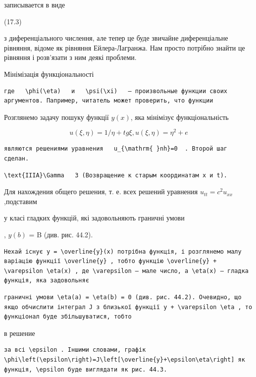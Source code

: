 \documentclass[
  ukrainian,
]{article}
\begin{document}
записывается в виде

(17.3)

з диференціального числення, але тепер це буде звичайне диференціальне
рівняння, відоме як рівняння Ейлера-Лагранжа. Нам просто потрібно знайти
це рівняння і розв'язати з ним деякі проблеми.

Мінімізація функціональності

\begin{verbatim}
где   \phi(\eta)   и   \psi(\xi)   — произвольные функции своих аргументов. Папример, читатель может проверить, что функции
\end{verbatim}

Розглянемо задачу пошуку функції \(y(x)\), яка мінімізує
функціональність

\[
u(\xi, \eta) = 1/\eta + tg \xi,    u(\xi, \eta) = \eta^2 + e
\]

\begin{verbatim}
являются решениями уравнения   u_{\mathrm{ }nh}=0  . Второй шаг сделан.
\end{verbatim}

\begin{verbatim}
\text{IIIA}\Gamma   3 (Возвращение к старым координатам x и t).
\end{verbatim}

Для нахождения общего решения, т. е. всех решений уравнения
\(u_{tt} = c^2 u_{xx}\),подставим

у класі гладких функцій, які задовольняють граничні умови

, \(y(b)\) = B (див. рис. 44.2).

\begin{verbatim}
Нехай існує y = \overline{y}(x) потрібна функція, і розглянемо малу варіацію функції \overline{y} , тобто функцію \overline{y} + \varepsilon \eta(x) , де \varepsilon — мале число, а \eta(x) — гладка функція, яка задовольняє
\end{verbatim}

\begin{verbatim}
граничні умови \eta(a) = \eta(b) = 0 (див. рис. 44.2). Очевидно, що якщо обчислити інтеграл J з близької функції y + \varepsilon \eta , то функціонал буде збільшуватися, тобто
\end{verbatim}

в решение

\begin{verbatim}
за всі \epsilon . Іншими словами, графік \phi\left(\epsilon\right)=J\left[\overline{y}+\epsilon\eta\right] як функція, \epsilon буде виглядати як рис. 44.3.
\end{verbatim}
\end{document}
